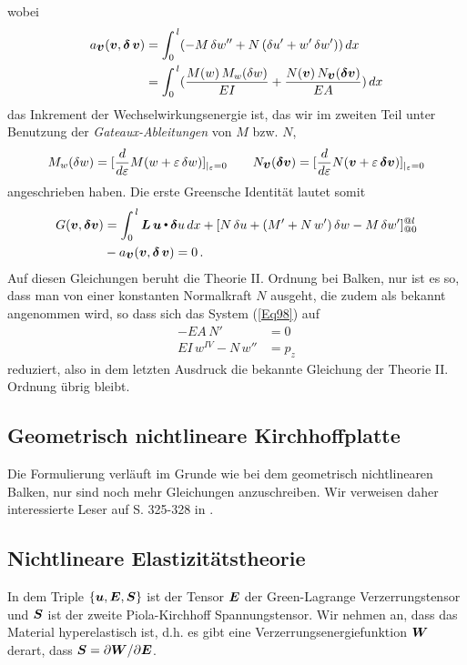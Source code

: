 wobei
\begin{align}
a_{\mbox{\boldmath $v$}}(\mbox{\boldmath $v$}, \mbox{\boldmath $\delta$}\,\mbox{\boldmath $v$}) &= \int_0^{\,l} (- M \,\delta w'' + N\,(\delta u' + w'\, \delta w'))\,dx \nonumber \\
&= \int_0^{\,l} (\frac{M(w)\,M_w(\delta w)}{EI} + \frac{N(\mbox{\boldmath $v$})\,N_{\mbox{\boldmath $v$}}(\mbox{\boldmath $\delta$} \mbox{\boldmath $v$})}{EA})\,dx
\end{align}
das Inkrement der Wechselwirkungsenergie ist, das wir im zweiten Teil unter Benutzung der {\em Gateaux-Ableitungen\/} von $M$ bzw. $N$,
\begin{align}
M_w(\delta w) = [\frac{d}{d\varepsilon} M(w + \varepsilon\,\delta w)]_{|_{\varepsilon} = 0} \qquad N_{\mbox{\boldmath $v$}}(\mbox{\boldmath $\delta$} \mbox{\boldmath $v$}) = [\frac{d}{d\varepsilon} N(\mbox{\boldmath $v$} + \varepsilon\,\mbox{\boldmath $\delta$} \mbox{\boldmath $v$})]_{|_{\varepsilon} = 0}
\end{align}
angeschrieben haben. Die erste Greensche Identit\"{a}t lautet somit
\begin{align}
G(\mbox{\boldmath $v$}, \mbox{\boldmath $\delta$} \mbox{\boldmath $v$}) &= \int_0^{\,l} \mbox{\boldmath $L$}\,\mbox{\boldmath $u$} {\,\scriptscriptstyle \stackrel{\bullet}{{}}}\, \mbox{\boldmath $\delta$} u\,dx +  [ N\,\delta u + (M' + N\,w')\,\delta w - M\,\delta w']_{@0}^{@l} \nonumber \\
&- a_{\mbox{\boldmath $v$}}(\mbox{\boldmath $v$}, \mbox{\boldmath $\delta$}\,\mbox{\boldmath $v$}) = 0\,.
\end{align}
Auf diesen Gleichungen beruht die Theorie II. Ordnung bei Balken, nur ist es so, dass man von einer konstanten Normalkraft $N$ ausgeht, die zudem als bekannt angenommen wird, so dass sich das System (\ref{Eq98}) auf
\begin{subequations}
\begin{align}
- EA\,N'\, &= 0 \\
EI\,w^{IV} - N\,w'' &= p_z
\end{align}
\end{subequations}
reduziert, also in dem letzten Ausdruck die bekannte Gleichung der Theorie II. Ordnung \"{u}brig bleibt.

\textcolor{sectionTitleBlue}{\section{Geometrisch nichtlineare Kirchhoffplatte}}
Die Formulierung verl\"{a}uft im Grunde wie bei dem geometrisch nichtlinearen Balken, nur sind noch mehr Gleichungen anzuschreiben. Wir verweisen daher interessierte Leser auf  S. 325-328 in \cite{Ha1}.

\textcolor{sectionTitleBlue}{\section{Nichtlineare Elastizit\"{a}tstheorie}}
In dem Triple $\{\mbox{\boldmath $u$},\mbox{\boldmath $E$}, \mbox{\boldmath $S$}\}$ ist der Tensor $\mbox{\boldmath $E$}$ der Green-Lagrange Verzerrungstensor und $\mbox{\boldmath $S$}$ ist der zweite Piola-Kirchhoff Spannungstensor. Wir nehmen an, dass das Material hyperelastisch ist, d.h. es gibt eine Verzerrungsenergiefunktion $\mbox{\boldmath $W$}$ derart, dass $\mbox{\boldmath $S$} = \partial \mbox{\boldmath $W$}/\partial \mbox{\boldmath $E$}$.

